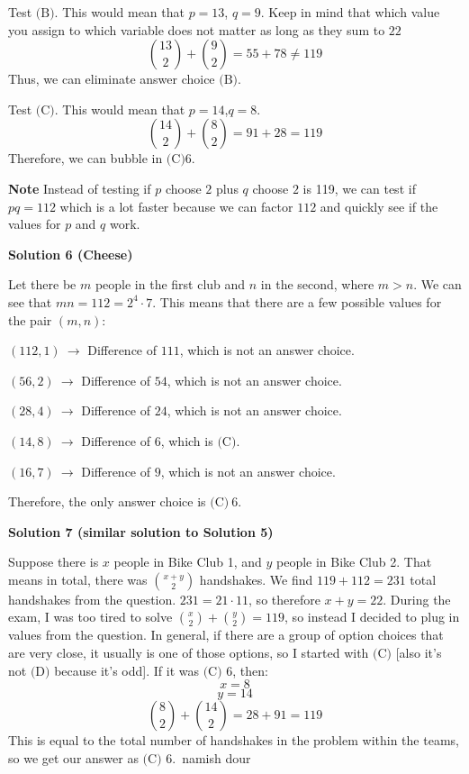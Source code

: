 \begin{enumerate}
 Test $\text{(B)}$. This would mean that $p=13$, $q=9$. Keep in mind that which value you assign to which variable does not matter as long as they sum to $22$
 \[{13 \choose 2}+{9 \choose 2}= 55+78 \neq 119\]Thus, we can eliminate answer choice $\text{(B)}$.

 Test $\text{(C)}$. This would mean that $p=14$,$q=8$.
 \[{14 \choose 2}+{8 \choose 2}=91+28=119\]Therefore, we can bubble in $\boxed{\text{(C)} 6}$.

 \textbf{Note} Instead of testing if $p$ choose $2$ plus $q$ choose $2$ is 119, we can test if $pq=112$ which is a lot faster because we can factor $112$ and quickly see if the values for $p$ and $q$ work.

 



\textbf{Solution 6 (Cheese)}

Let there be $m$ people in the first club and $n$ in the second, where $m>n$. We can see that $mn=112=2^4\cdot7$. This means that there are a few possible values for the pair $(m,n)$:

 $(112,1)~\rightarrow$ Difference of $111$, which is not an answer choice.

 $(56,2)~\rightarrow$ Difference of $54$, which is not an answer choice.

 $(28,4)~\rightarrow$ Difference of $24$, which is not an answer choice.

 $(14,8)~\rightarrow$ Difference of $6$, which is $\text{(C)}$.

 $(16,7)~\rightarrow$ Difference of $9$, which is not an answer choice.

 Therefore, the only answer choice is $\boxed{\text{(C)}~6}$.

 



\textbf{Solution 7 (similar solution to Solution 5)}

Suppose there is $x$ people in Bike Club 1, and $y$ people in Bike Club 2. That means in total, there was $\binom{x+y}{2}$ handshakes. We find $119+112=231$ total handshakes from the question. $231=21 \cdot 11$, so therefore $x+y=22$. During the exam, I was too tired to solve $\binom{x}{2}+\binom{y}{2}=119$, so instead I decided to plug in values from the question. In general, if there are a group of option choices that are very close, it usually is one of those options, so I started with $\text{(C)}$ [also it's not $\text{(D)}$ because it's odd]. If it was $\text{(C) 6}$, then:
 \[x=8\]
 \[y=14\]
 \[\binom{8}{2}+\binom{14}{2}=28+91=119\]This is equal to the total number of handshakes in the problem within the teams, so we get our answer as $\boxed{\text{(C) }6}$.~namish dour


\end{enumerate}
